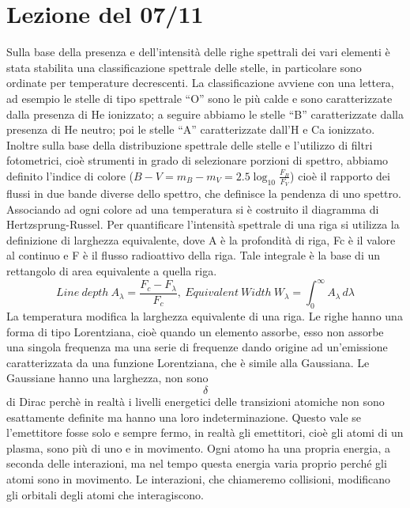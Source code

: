 \documentclass[a4paper,11pt]{article}
\begin{document}
    
\newpage
\section{Lezione del 07/11}
    Sulla base della presenza e dell’intensità delle righe spettrali dei vari elementi è stata stabilita una classificazione spettrale delle stelle, in particolare sono ordinate per temperature decrescenti. La classificazione avviene con una lettera, ad esempio le stelle di tipo spettrale “O” sono le più calde e sono caratterizzate dalla presenza di He ionizzato; a seguire abbiamo le stelle “B” caratterizzate dalla presenza di He neutro; poi le stelle “A” caratterizzate dall’H e Ca ionizzato. Inoltre sulla base della distribuzione spettrale delle stelle e l’utilizzo di filtri fotometrici, cioè strumenti in grado di selezionare porzioni di spettro, abbiamo definito l’indice di colore (\begin{math}
        B-V=m_B-m_V=2.5\log_{10}{\frac{F_B}{F_V}}
    \end{math}) cioè il rapporto dei flussi in due bande diverse dello spettro, che definisce la pendenza di uno spettro.  Associando ad ogni colore ad una temperatura si è costruito il diagramma di Hertzsprung-Russel. Per quantificare l’intensità spettrale di una riga si utilizza la definizione di larghezza equivalente, dove A è la profondità di riga, Fc è il valore al continuo e F è il flusso radioattivo della riga. Tale integrale è la base di un rettangolo di area equivalente a quella riga.\\
    $$Line\ depth\ A_\lambda=\frac{F_c-F_\lambda}{F_c},\ Equivalent\ Width\ W_\lambda=\int_{0}^{\infty} A_\lambda \,d\lambda$$
    La temperatura modifica la larghezza equivalente di una riga.  Le righe hanno una forma di tipo Lorentziana, cioè quando un elemento assorbe, esso non assorbe una singola frequenza ma una serie di frequenze dando origine ad un’emissione caratterizzata da una funzione Lorentziana, che è simile alla Gaussiana. Le Gaussiane hanno una larghezza, non sono $$ \delta $$ di Dirac perchè in realtà i livelli energetici delle transizioni atomiche non sono esattamente definite ma hanno una loro indeterminazione. Questo vale se l’emettitore fosse solo e sempre fermo, in realtà gli emettitori, cioè gli atomi di un plasma, sono più di uno e in movimento. Ogni atomo ha una propria energia, a seconda delle interazioni, ma nel tempo questa energia varia proprio perché gli atomi sono in movimento. Le interazioni, che chiameremo collisioni, modificano gli orbitali degli atomi che interagiscono.\\
\end{document}
